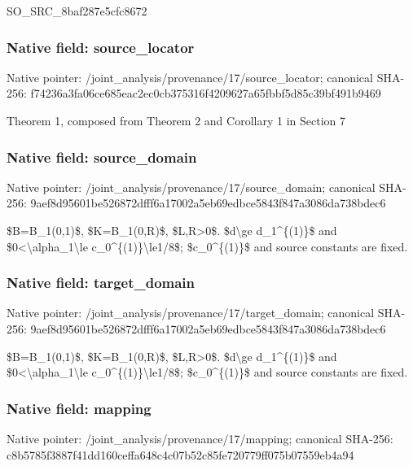 \documentclass[10pt,a4paper]{article}
\begin{document}
SO\_SRC\_8baf287e5cfc8672


\subsubsection{Native field: source\_locator}


Native pointer: /joint\_analysis/provenan\allowbreak{}ce/17/source\_locator; canonical SHA-256: f74236a3fa06ce685eac2ec0\allowbreak{}cb375316f4209627a65fbbf5\allowbreak{}d85c39bf491b9469


Theorem 1, composed from Theorem 2 and Corollary 1 in Section 7


\subsubsection{Native field: source\_domain}


Native pointer: /joint\_analysis/provenan\allowbreak{}ce/17/source\_domain; canonical SHA-256: 9aef8d95601be526872dfff6\allowbreak{}a17002a5eb69edbce5843f84\allowbreak{}7a3086da738bdec6


\$B=B\_1(0,1)\$, \$K=B\_1(0,R)\$, \$L,R>0\$. \$d\textbackslash{}ge d\_1\textasciicircum{}\{(1)\}\$ and \$0<\textbackslash{}alpha\_1\textbackslash{}le c\_0\textasciicircum{}\{(1)\}\textbackslash{}le1/8\$; \$c\_0\textasciicircum{}\{(1)\}\$ and source constants are fixed.


\subsubsection{Native field: target\_domain}


Native pointer: /joint\_analysis/provenan\allowbreak{}ce/17/target\_domain; canonical SHA-256: 9aef8d95601be526872dfff6\allowbreak{}a17002a5eb69edbce5843f84\allowbreak{}7a3086da738bdec6


\$B=B\_1(0,1)\$, \$K=B\_1(0,R)\$, \$L,R>0\$. \$d\textbackslash{}ge d\_1\textasciicircum{}\{(1)\}\$ and \$0<\textbackslash{}alpha\_1\textbackslash{}le c\_0\textasciicircum{}\{(1)\}\textbackslash{}le1/8\$; \$c\_0\textasciicircum{}\{(1)\}\$ and source constants are fixed.


\subsubsection{Native field: mapping}


Native pointer: /joint\_analysis/provenance/17/mapping; canonical SHA-256: c8b5785f3887f41dd160ceff\allowbreak{}a648c4c07b52c85fe720779f\allowbreak{}f075b07559eb4a94
\end{document}
